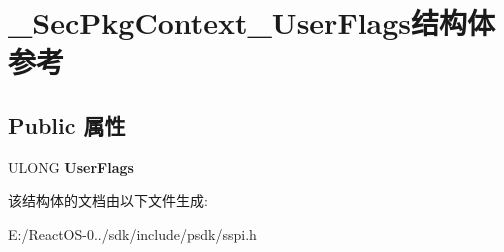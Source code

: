 \hypertarget{struct___sec_pkg_context___user_flags}{}\section{\+\_\+\+Sec\+Pkg\+Context\+\_\+\+User\+Flags结构体 参考}
\label{struct___sec_pkg_context___user_flags}
\subsection*{Public 属性}
\begin{DoxyCompactItemize}
\item 
\mbox{\label{struct___sec_pkg_context___user_flags_adbda1d2b81fde1b9e89bfd1504574176}} 
U\+L\+O\+NG {\bfseries User\+Flags}
\end{DoxyCompactItemize}


该结构体的文档由以下文件生成\+:\begin{DoxyCompactItemize}
\item 
E\+:/\+React\+O\+S-\/0../sdk/include/psdk/sspi.\+h\end{DoxyCompactItemize}
